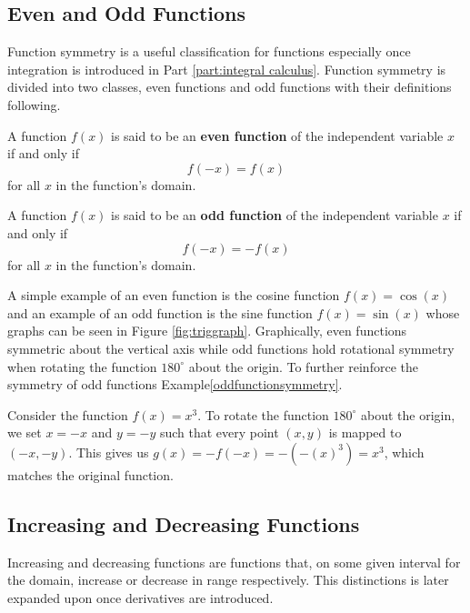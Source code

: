 \subsection{Even and Odd Functions}\label{sect:even and odd functions}

Function symmetry is a useful classification for functions especially once integration is introduced in Part \ref{part:integral calculus}. Function symmetry is divided into two classes, even functions and odd functions with their definitions following.

\begin{definition}
    A function $f(x)$ is said to be an \textbf{even function} of the independent variable $x$ if and only if
    $$
    f(-x) = f(x)
    $$
    for all $x$ in the function's domain.
\end{definition}

\begin{definition}
    A function $f(x)$ is said to be an \textbf{odd function} of the independent variable $x$ if and only if
    $$
    f(-x) = -f(x)
    $$
    for all $x$ in the function's domain.
\end{definition}

A simple example of an even function is the cosine function $f(x) = \cos(x)$ and an example of an odd function is the sine function $f(x) = \sin(x)$ whose graphs can be seen in Figure \ref{fig:triggraph}. Graphically, even functions symmetric about the vertical axis while odd functions hold rotational symmetry when rotating the function $180^\circ$ about the origin. To further reinforce the symmetry of odd functions Example\ref{oddfunctionsymmetry}.

\begin{example}\label{oddfunctionsymmetry}
    Consider the function $f(x) = x^3$. To rotate the function $180^\circ$ about the origin, we set $x = -x$ and $y = -y$ such that every point $(x,y)$ is mapped to $(-x,-y)$. This gives us $g(x) = -f(-x) = -(-(x)^3) = x^3$, which matches the original function. 
\end{example}

\subsection{Increasing and Decreasing Functions}\label{sect:increasing and decreasing functions}

Increasing and decreasing functions are functions that, on some given interval for the domain, increase or decrease in range respectively. This distinctions is later expanded upon once derivatives are introduced.

